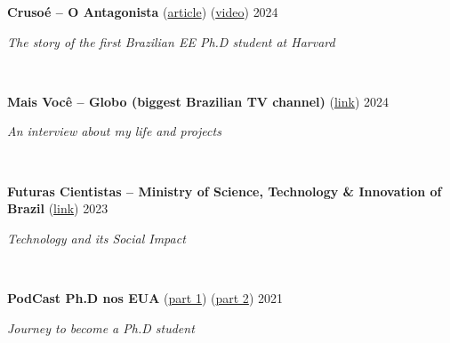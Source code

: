 \documentclass[letterpaper,10pt]{article}
\newcommand{\entry}[4]{

\begin{minipage}[t]{.15\textwidth}
\end{minipage}
\hfill\vline\hfill 
\begin{minipage}[t]{0.95\textwidth}
#2 \hfill \textsc{#1}

\textit{#3}

\footnotesize{#4}
\end{minipage}\\\vspace{.25cm}}
\begin{document}
\entry{2024}{\textbf{Crusoé -- O Antagonista} (\href{https://crusoe.com.br/edicoes/325/a-historia-do-primeiro-brasileiro-phd-em-engenharia-em-harvard/}{article}) (\href{https://www.youtube.com/watch?v=wmis_W-EFKk}{video})}{The story of the first Brazilian EE Ph.D student at Harvard}{}

\entry{2024}{\textbf{Mais Você -- Globo (biggest Brazilian TV channel)} (\href{https://globoplay.globo.com/v/12673677/}{link})}{An interview about my life and projects}{}

\entry{2023}{\textbf{Futuras Cientistas -- Ministry of Science, Technology \& Innovation of Brazil} (\href{https://www.youtube.com/watch?v=g5Inc6qXO6k&ab_channel=FuturasCientistas}{link})}{Technology and its Social Impact}{}

\entry{2021}{\textbf{PodCast Ph.D nos EUA} (\href{https://open.spotify.com/episode/37Rn34gdy7AxNgHeAvdIH0?si=11bf338624d04113}{part 1}) (\href{https://open.spotify.com/episode/7zYdb51lXeKbfpULOgpQlx?si=d1dbd10b9197486e}{part 2})}{Journey to become a Ph.D student}{}
\end{document}
